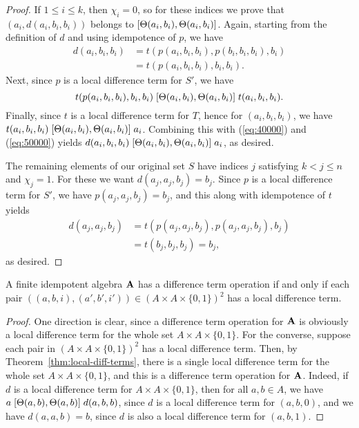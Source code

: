 \begin{proof}
If $1\leq i \leq k$, then $\chi_i =0$, so for these indices we prove
that $(a_i, d(a_i,b_i,b_i))$ belongs to $\mathrel{[\Theta(a_i,b_i), \Theta(a_i,b_i)]}$.
Again, starting from the definition of $d$ and using idempotence of $p$, we have
\begin{align}
  d(a_i,b_i,b_i) &=
  t(p(a_i,b_i,b_i), p(b_i,b_i,b_i), b_i)   \label{eq:40000}\\
  &=t(p(a_i,b_i,b_i), b_i, b_i). \nonumber
\end{align}
Next, since $p$ is a local difference term for $S'$, we have
\begin{equation}
  \label{eq:50000}
  t(p(a_i,b_i,b_i), b_i, b_i)
 \comm{\Cg(a_i,b_i)}{\Cg(a_i,b_i)}
 t(a_i, b_i, b_i).
\end{equation}
Finally, since $t$ is a local difference term for $T$, hence for
$(a_i, b_i, b_i)$,  %
we have 
$t(a_i, b_i, b_i) \mathrel{[\Theta(a_i,b_i), \Theta(a_i,b_i)]} a_i$.
Combining this with (\ref{eq:40000}) and (\ref{eq:50000}) yields
$d(a_i,b_i,b_i) \mathrel{[\Theta(a_i,b_i), \Theta(a_i,b_i)]} a_i$,
as desired.

The remaining elements of our original set $S$
have indices $j$ satisfying $k<j\leq n$ and $\chi_j = 1$.
For these we want $d(a_j,a_j,b_j) = b_j$.
Since $p$ is a local difference term for $S'$, we have
$p(a_j,a_j,b_j) = b_j$, and this along with idempotence of $t$ yields
\begin{align*}
d(a_j,a_j,b_j) &=
t(p(a_j,a_j,b_j), p(a_j,a_j,b_j), b_j)\\
&=t(b_j, b_j, b_j) =b_j,
\end{align*}
as desired.
\end{proof}

\begin{cor}
  \label{cor:loc-diff-term}
  A finite idempotent algebra $\mathbf{A}$ has a difference term operation if and
  only if each pair $((a,b,i), (a',b',i')) \in (A\times A \times \{0,1\})^2$ has a local
  difference term.
\end{cor}
\begin{proof}
  One direction is clear, since a difference term operation for $\mathbf{A}$ is
  obviously a local difference term for the whole set 
  $A\times A \times \{0,1\}$.
  For the converse, suppose
  each pair in $(A\times A \times \{0,1\})^2$ has a local
  difference term. Then, by Theorem~\ref{thm:local-diff-terms},
  there is a single local difference term for the whole set $A\times A \times \{0,1\}$,
  and this is a difference term operation for $\mathbf{A}$.  Indeed, if $d$ is a
  local difference term for $A\times A \times \{0,1\}$, then 
  for all $a, b \in A$, we have
  $a \mathrel{[\Theta(a,b), \Theta(a,b)]} d(a,b,b)$,
  since $d$ is a local difference term for $(a,b,0)$, and we have
  $d(a,a,b) = b$, since $d$ is also a local difference term for
  $(a,b,1)$.
\end{proof}

